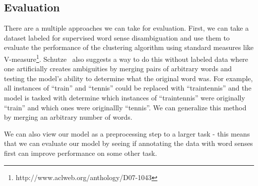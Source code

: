 \documentclass[11pt,letterpaper]{article}
\begin{document}
\subsection{Evaluation}
There are a multiple approaches we can take for evaluation. First, we can take a dataset labeled for supervised word sense disambiguation and use them to evaluate the performance of the clustering algorithm using standard measures like V-measure\footnote{http://www.aclweb.org/anthology/D07-1043}. Schutze~ also suggests a way to do this without labeled data where one artificially creates ambiguities by merging pairs of arbitrary words and testing the model's ability to determine what the original word was. For example, all instances of ``train'' and ``tennis'' could be replaced with ``traintennis'' and the model is tasked with determine which instances of ``traintennis'' were originally ``train'' and which ones were originallly ``tennis''. We can generalize this method by merging an arbitrary number of words. 

We can also view our model as a preprocessing step to a larger task - this means that we can evaluate our model by seeing if annotating the data with word senses first can improve performance on some other task.  



\end{document}
